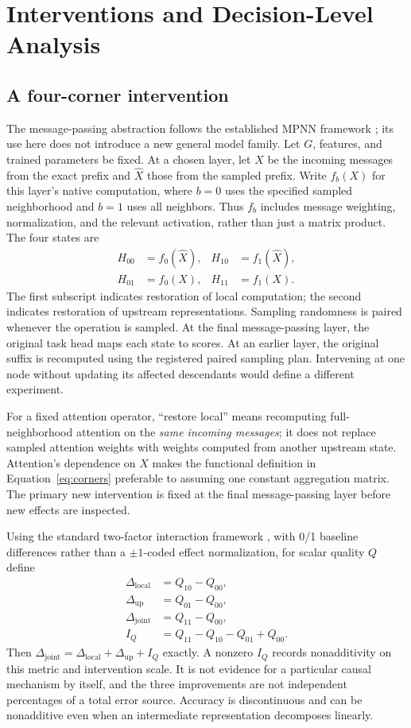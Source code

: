 \section{Interventions and Decision-Level Analysis}
\label{sec:analysis}
\subsection{A four-corner intervention}
The message-passing abstraction follows the established MPNN framework \cite{gilmer2017neural}; its use here does not introduce a new general model family. Let $G$, features, and trained parameters be fixed. At a chosen layer, let $X$ be the incoming messages from the exact prefix and $\widehat X$ those from the sampled prefix. Write $f_b(X)$ for this layer's native computation, where $b=0$ uses the specified sampled neighborhood and $b=1$ uses all neighbors. Thus $f_b$ includes message weighting, normalization, and the relevant activation, rather than just a matrix product. The four states are
\begin{align}
H_{00}&=f_0(\widehat X), & H_{10}&=f_1(\widehat X),\\
H_{01}&=f_0(X), & H_{11}&=f_1(X).
\label{eq:corners}
\end{align}
The first subscript indicates restoration of local computation; the second indicates restoration of upstream representations. Sampling randomness is paired whenever the operation is sampled. At the final message-passing layer, the original task head maps each state to scores. At an earlier layer, the original suffix is recomputed using the registered paired sampling plan. Intervening at one node without updating its affected descendants would define a different experiment.

For a fixed attention operator, ``restore local'' means recomputing full-neighborhood attention on the \emph{same incoming messages}; it does not replace sampled attention weights with weights computed from another upstream state. Attention's dependence on $X$ makes the functional definition in Equation~\eqref{eq:corners} preferable to assuming one constant aggregation matrix. The primary new intervention is fixed at the final message-passing layer before new effects are inspected.

Using the standard two-factor interaction framework \cite{nist2012handbook}, with 0/1 baseline differences rather than a $\pm1$-coded effect normalization, for scalar quality $Q$ define
\begin{align}
\Delta_{\mathrm{local}}&=Q_{10}-Q_{00},\\
\Delta_{\mathrm{up}}&=Q_{01}-Q_{00},\\
\Delta_{\mathrm{joint}}&=Q_{11}-Q_{00},\\
I_Q&=Q_{11}-Q_{10}-Q_{01}+Q_{00}.
\label{eq:interaction}
\end{align}
Then $\Delta_{\mathrm{joint}}=\Delta_{\mathrm{local}}+\Delta_{\mathrm{up}}+I_Q$ exactly. A nonzero $I_Q$ records nonadditivity on this metric and intervention scale. It is not evidence for a particular causal mechanism by itself, and the three improvements are not independent percentages of a total error source. Accuracy is discontinuous and can be nonadditive even when an intermediate representation decomposes linearly.

